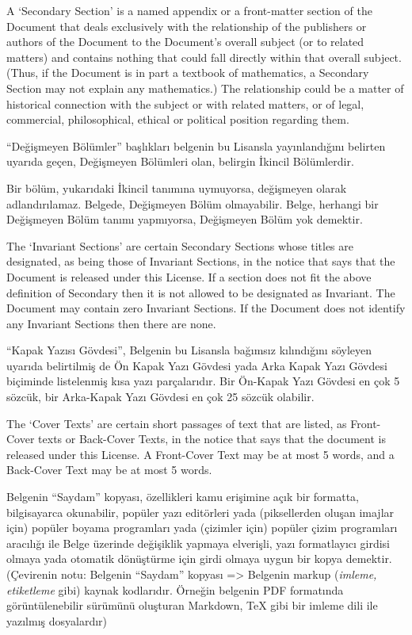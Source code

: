 \begin{multicols}{2}
\begin{ingliz}
A `Secondary Section' is
a named appendix or a front-matter section of the Document
that deals exclusively with the relationship of the publishers
or authors of the Document to the Document's overall
subject (or to related matters) and contains nothing that
could fall directly within that overall subject.  (Thus, if
the Document is in part a textbook of mathematics, a Secondary
Section may not explain any mathematics.)  The relationship
could be a matter of historical connection with the subject or
with related matters, or of legal, commercial, philosophical,
ethical or political position regarding them.
\end{ingliz}

\label{gfdl-inv-sect}%
“Değişmeyen Bölümler”
başlıkları belgenin bu Lisansla yayınlandığını belirten
uyarıda geçen, Değişmeyen Bölümleri olan, belirgin İkincil Bölümlerdir.

Bir bölüm, yukarıdaki İkincil tanımına uymuyorsa, değişmeyen
olarak adlandırılamaz. Belgede, Değişmeyen Bölüm olmayabilir.
Belge, herhangi bir Değişmeyen Bölüm tanımı yapmıyorsa,
Değişmeyen Bölüm yok demektir.

\begin{ingliz}
The `Invariant Sections'
are certain Secondary Sections whose titles are designated, as
being those of Invariant Sections, in the notice that says
that the Document is released under this License.
If a section does not fit the above definition of Secondary then it
is not allowed to be designated as Invariant.  The Document
may contain zero Invariant Sections.  If the Document does not
identify any Invariant Sections then there are none.
\end{ingliz}


\label{gfdl-cov-text}%
“Kapak Yazısı Gövdesi”, Belgenin bu Lisansla bağımsız kılındığını söyleyen uyarıda belirtilmiş de Ön Kapak Yazı Gövdesi yada Arka Kapak Yazı Gövdesi biçiminde listelenmiş kısa yazı parçalarıdır. Bir Ön-Kapak Yazı Gövdesi en çok 5 sözcük, bir Arka-Kapak Yazı Gövdesi en çok 25 sözcük olabilir.

\begin{ingliz}
The `Cover Texts' are
certain short passages of text that are listed, as Front-Cover
texts or Back-Cover Texts, in the notice that says that the
document is released under this License.  A Front-Cover Text
may be at most 5 words, and a Back-Cover Text may be at most
5 words.
\end{ingliz}

\label{gfdl-transparent}%
Belgenin “Saydam” kopyası, özellikleri kamu erişimine açık bir formatta, bilgisayarca okunabilir, popüler yazı editörleri yada (piksellerden oluşan imajlar için) popüler boyama programları yada (çizimler için) popüler çizim programları aracılığı ile Belge üzerinde değişiklik yapmaya elverişli, yazı formatlayıcı girdisi olmaya yada otomatik dönüştürme için girdi olmaya uygun bir kopya demektir. (Çevirenin notu: Belgenin ``Saydam'' kopyası => Belgenin markup (\emph{imleme, etiketleme} gibi) kaynak kodlarıdır. Örneğin belgenin PDF formatında görüntülenebilir sürümünü oluşturan Markdown, TeX gibi bir imleme dili ile yazılmış dosyalardır)


\end{multicols}
